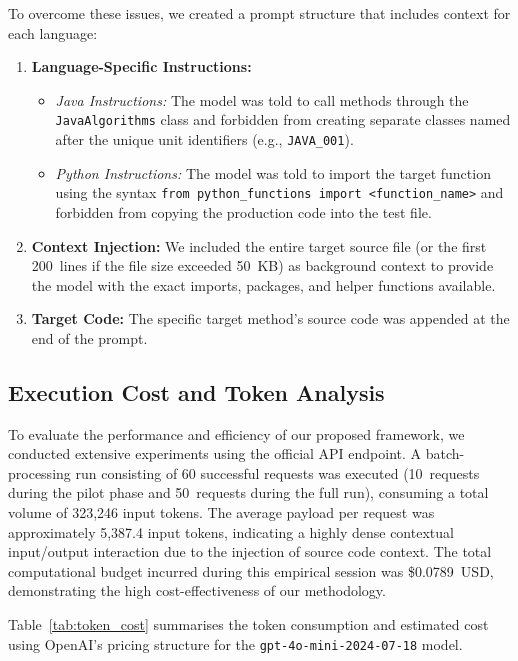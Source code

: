 \documentclass[conference]{IEEEtran}
\begin{document}
To overcome these issues, we created a prompt structure that includes context for
each language:
\begin{enumerate}
    \item \textbf{Language-Specific Instructions:}
    \begin{itemize}
        \item \textit{Java Instructions:} The model was told to call methods
        through the \texttt{JavaAlgorithms} class and forbidden from creating
        separate classes named after the unique unit identifiers
        (e.g., \texttt{JAVA\_001}).
        \item \textit{Python Instructions:} The model was told to import the
        target function using the syntax
        \texttt{from python\_functions import <function\_name>} and forbidden
        from copying the production code into the test file.
    \end{itemize}
    \item \textbf{Context Injection:} We included the entire target source file
    (or the first 200~lines if the file size exceeded 50~KB) as background
    context to provide the model with the exact imports, packages, and helper
    functions available.
    \item \textbf{Target Code:} The specific target method's source code was
    appended at the end of the prompt.
\end{enumerate}

\subsection{Execution Cost and Token Analysis}
\label{subsec:execution_cost}

To evaluate the performance and efficiency of our proposed framework, we
conducted extensive experiments using the official API endpoint.
A batch-processing run consisting of 60 successful requests was executed
(10~requests during the pilot phase and 50~requests during the full run),
consuming a total volume of 323,246 input tokens.
The average payload per request was approximately 5,387.4 input tokens,
indicating a highly dense contextual input/output interaction due to the
injection of source code context.
The total computational budget incurred during this empirical session was
\$0.0789~USD, demonstrating the high cost-effectiveness of our methodology.

Table~\ref{tab:token_cost} summarises the token consumption and estimated cost
using OpenAI's pricing structure for the \texttt{gpt-4o-mini-2024-07-18} model.
\end{document}

